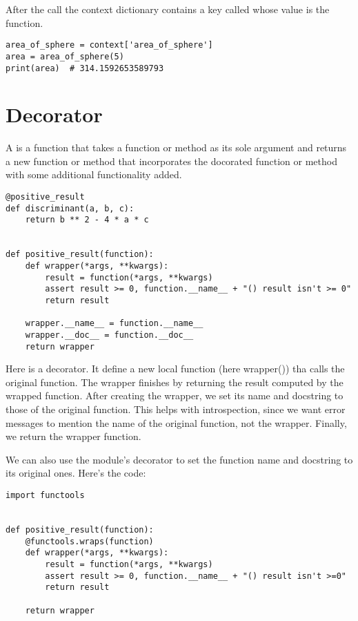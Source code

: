 After the  call the context dictionary contains a key called  whose value is the  function.


\begin{lstlisting}
area_of_sphere = context['area_of_sphere']
area = area_of_sphere(5)
print(area)  # 314.1592653589793  

\end{lstlisting}



\section{Decorator}
\label{sec:decorator}

A  is a function that takes a function or method as its sole argument and returns a new function or method that incorporates the docorated function or method  with some additional functionality added.

\begin{lstlisting}
@positive_result
def discriminant(a, b, c):
    return b ** 2 - 4 * a * c


def positive_result(function):
    def wrapper(*args, **kwargs):
        result = function(*args, **kwargs)
        assert result >= 0, function.__name__ + "() result isn't >= 0"
        return result

    wrapper.__name__ = function.__name__
    wrapper.__doc__ = function.__doc__
    return wrapper
\end{lstlisting}

Here  is a decorator.
It define a new local function (here wrapper()) tha calls the original function.
The wrapper finishes by returning the result computed by the wrapped function.
After creating the wrapper, we set its name and docstring to those of the original function.
This helps with introspection, since we want error messages to mention the name of the original function, not the wrapper.
Finally, we return the wrapper function.


We can also use the  module's  decorator to set the function name and docstring to its original ones.
Here's the code:
\begin{lstlisting}
import functools


def positive_result(function):
    @functools.wraps(function)
    def wrapper(*args, **kwargs):
        result = function(*args, **kwargs)
        assert result >= 0, function.__name__ + "() result isn't >=0"
        return result

    return wrapper 
\end{lstlisting}

